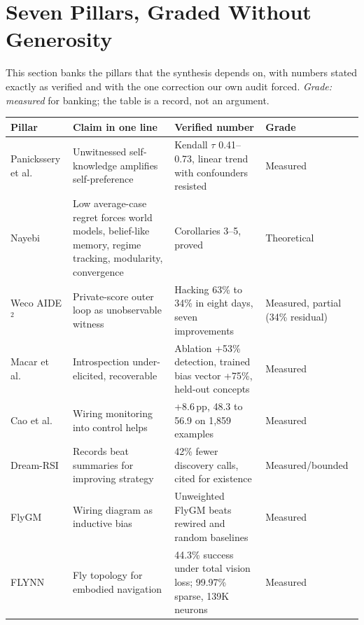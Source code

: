 \section{Seven Pillars, Graded Without Generosity}
\label{sec:ch09-pillars}

This section banks the pillars that the synthesis depends on, with numbers stated exactly as verified and with the one correction our own audit forced. \textit{Grade: measured} for banking; the table is a record, not an argument.

\begin{center}
\small
\begin{tabular}{p{3.2cm}p{3.2cm}p{4.0cm}p{2.4cm}}
\toprule
Pillar & Claim in one line & Verified number & Grade \\
\midrule
Panickssery et al.\ \cite{panickssery2024} & Unwitnessed self-knowledge amplifies self-preference & Kendall $\tau$ 0.41--0.73, linear trend with confounders resisted & Measured \\
Nayebi \cite{nayebi2026} & Low average-case regret forces world models, belief-like memory, regime tracking, modularity, convergence & Corollaries 3--5, proved & Theoretical \\
Weco AIDE$^{2}$ \cite{weco2026} & Private-score outer loop as unobservable witness & Hacking 63\% to 34\% in eight days, seven improvements & Measured, partial (34\% residual) \\
Macar et al.\ \cite{macar2026} & Introspection under-elicited, recoverable & Ablation +53\% detection, trained bias vector +75\%, held-out concepts & Measured \\
Cao et al.\ \cite{cao2026} & Wiring monitoring into control helps & +8.6\,pp, 48.3 to 56.9 on 1,859 examples & Measured \\
Dream-RSI \cite{dreamrsi2026} & Records beat summaries for improving strategy & 42\% fewer discovery calls, cited for existence & Measured/bounded \\
FlyGM \cite{flygm2026} & Wiring diagram as inductive bias & Unweighted FlyGM beats rewired and random baselines & Measured \\
FLYNN \cite{flynn2026} & Fly topology for embodied navigation & 44.3\% success under total vision loss; 99.97\% sparse, 139K neurons & Measured \\
\bottomrule
\end{tabular}
\end{center}

